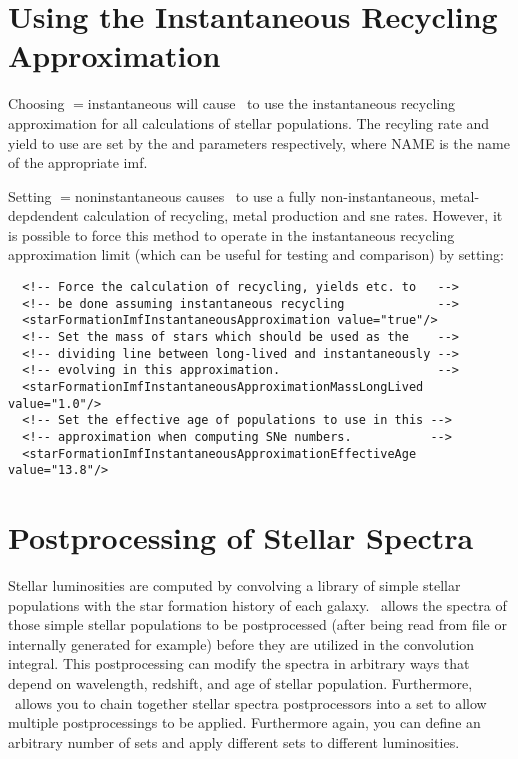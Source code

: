 \section{Using the Instantaneous Recycling Approximation}

Choosing {\normalfont \ttfamily [stellarPopulationPropertiesMethod]}$=${\normalfont \ttfamily instantaneous} will cause \glc\ to use the instantaneous recycling approximation for all calculations of stellar populations. The recyling rate and yield to use are set by the {\normalfont \ttfamily [imfNAMERecycledInstantaneous]} and {\normalfont \ttfamily [imfNAMEYieldInstantaneous]} parameters respectively, where {\normalfont \ttfamily NAME} is the name of the appropriate \gls{imf}.

Setting {\normalfont \ttfamily [stellarPopulationPropertiesMethod]}$=${\normalfont \ttfamily noninstantaneous} causes \glc\ to use a fully non-instantaneous, metal-depdendent calculation of recycling, metal production and \gls{sne} rates. However, it is possible to force this method to operate in the instantaneous recycling approximation limit (which can be useful for testing and comparison) by setting:
\begin{verbatim}
  <!-- Force the calculation of recycling, yields etc. to   -->
  <!-- be done assuming instantaneous recycling             -->
  <starFormationImfInstantaneousApproximation value="true"/>
  <!-- Set the mass of stars which should be used as the    -->
  <!-- dividing line between long-lived and instantaneously -->
  <!-- evolving in this approximation.                      -->
  <starFormationImfInstantaneousApproximationMassLongLived value="1.0"/>
  <!-- Set the effective age of populations to use in this -->
  <!-- approximation when computing SNe numbers.           -->
  <starFormationImfInstantaneousApproximationEffectiveAge value="13.8"/>
\end{verbatim}

\section{Postprocessing of Stellar Spectra}

Stellar luminosities are computed by convolving a library of simple stellar populations with the star formation history of each galaxy. \glc\ allows the spectra of those simple stellar populations to be postprocessed (after being read from file or internally generated for example) before they are utilized in the convolution integral. This postprocessing can modify the spectra in arbitrary ways that depend on wavelength, redshift, and age of stellar population. Furthermore, \glc\ allows you to chain together stellar spectra postprocessors into a set to allow multiple postprocessings to be applied. Furthermore again, you can define an arbitrary number of sets and apply different sets to different luminosities.


